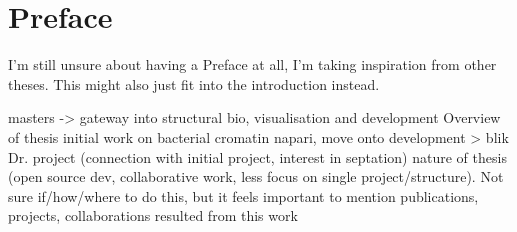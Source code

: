 \chapter{Preface}


I'm still unsure about having a Preface at all, I'm taking inspiration from other theses. This might also just fit into the introduction instead.

\begin{outline}
\1 masters -> gateway into structural bio, visualisation and development
\1 Overview of thesis
    \2 initial work on bacterial cromatin
    \2 napari, move onto development > blik
    \2 Dr. project (connection with initial project, interest in septation)
\1 nature of thesis (open source dev, collaborative work, less focus on single project/structure). Not sure if/how/where to do this, but it feels important to mention
\1 publications, projects, collaborations resulted from this work
\end{outline}
